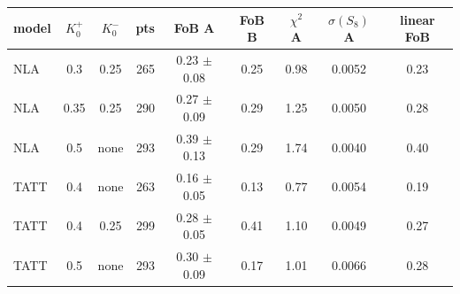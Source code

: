 \begin{tabular}{lcc r ccc cc}\toprule
model & $K_0^+$ & $K_0^-$ & pts & FoB A & FoB B & $\chi^2$ A & $\sigma(S_8)$ A & linear FoB\\ \midrule
NLA & 0.3 & 0.25 & 265 & 0.23 $\pm$ 0.08 & 0.25 & 0.98 & 0.0052 & 0.23\\
NLA & 0.35 & 0.25 & 290 & 0.27 $\pm$ 0.09 & 0.29 & 1.25 & 0.0050 & 0.28\\
NLA & 0.5 & none & 293 & 0.39 $\pm$ 0.13 & 0.29 & 1.74 & 0.0040 & 0.40\\
TATT & 0.4 & none & 263 & 0.16 $\pm$ 0.05 & 0.13 & 0.77 & 0.0054 & 0.19\\
TATT & 0.4 & 0.25 & 299 & 0.28 $\pm$ 0.05 & 0.41 & 1.10 & 0.0049 & 0.27\\
TATT & 0.5 & none & 293 & 0.30 $\pm$ 0.09 & 0.17 & 1.01 & 0.0066 & 0.28\\
\bottomrule\end{tabular}
